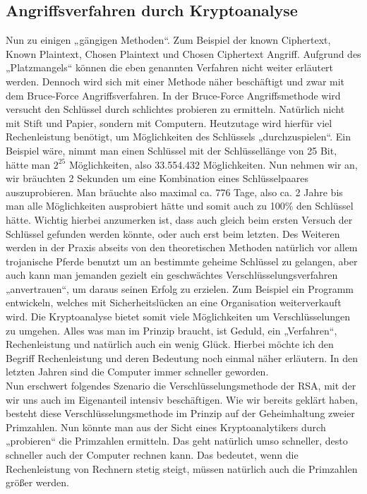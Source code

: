\subsection{Angriffsverfahren durch Kryptoanalyse}
Nun zu einigen „gängigen Methoden“. Zum Beispiel der known Ciphertext, Known Plaintext, Chosen Plaintext und Chosen Ciphertext Angriff. Aufgrund des „Platzmangels“ können die eben genannten Verfahren nicht weiter erläutert werden. Dennoch wird sich mit einer Methode näher beschäftigt und zwar mit dem Bruce-Force Angriffsverfahren. In der Bruce-Force Angriffsmethode wird versucht den Schlüssel durch schlichtes probieren zu ermitteln. Natürlich nicht mit Stift und Papier, sondern mit Computern. Heutzutage wird hierfür viel Rechenleistung benötigt, um Möglichkeiten des Schlüssels „durchzuspielen“. Ein Beispiel wäre, nimmt man einen Schlüssel mit der Schlüssellänge von 25 Bit, hätte man $2^25$ Möglichkeiten, also 33.554.432 Möglichkeiten. Nun nehmen wir an, wir bräuchten 2 Sekunden um eine Kombination eines Schlüsselpaares auszuprobieren. Man bräuchte also maximal ca. 776 Tage, also ca. 2 Jahre bis man alle Möglichkeiten ausprobiert hätte und somit auch zu 100\% den Schlüssel hätte. Wichtig hierbei anzumerken ist, dass auch gleich beim ersten Versuch der Schlüssel gefunden werden könnte, oder auch erst beim letzten. Des Weiteren werden in der Praxis abseits von den theoretischen Methoden natürlich vor allem trojanische Pferde benutzt um an bestimmte geheime Schlüssel zu gelangen, aber auch kann man jemanden gezielt ein geschwächtes Verschlüsselungsverfahren „anvertrauen“, um daraus seinen Erfolg zu erzielen. Zum Beispiel ein Programm entwickeln, welches mit Sicherheitslücken an eine Organisation weiterverkauft wird. Die Kryptoanalyse bietet somit viele Möglichkeiten um Verschlüsselungen zu umgehen. Alles was man im Prinzip braucht, ist Geduld, ein „Verfahren“, Rechenleistung und natürlich auch ein wenig Glück. Hierbei möchte ich den Begriff Rechenleistung und deren Bedeutung noch einmal näher erläutern. In den letzten Jahren sind die Computer immer schneller geworden.\\
Nun erschwert folgendes Szenario die Verschlüsselungsmethode der RSA, mit der wir uns auch im Eigenanteil intensiv beschäftigen. Wie wir bereits geklärt haben, besteht diese Verschlüsselungsmethode im Prinzip auf der Geheimhaltung zweier Primzahlen. Nun könnte man aus der Sicht eines Kryptoanalytikers durch „probieren“ die Primzahlen ermitteln. Das geht natürlich umso schneller, desto schneller auch der Computer rechnen kann. Das bedeutet, wenn die Rechenleistung von Rechnern stetig steigt, müssen natürlich auch die Primzahlen größer werden.

